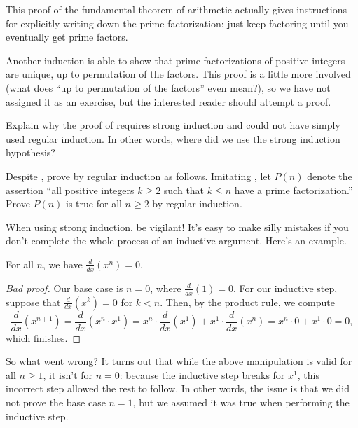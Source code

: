 \documentclass[../notes.tex]{subfiles}
\begin{document}
\begin{remark}
    This proof of the fundamental theorem of arithmetic actually gives instructions for explicitly writing down the prime factorization: just keep factoring until you eventually get prime factors. %
\end{remark}
\begin{remark}
    Another induction is able to show that prime factorizations of positive integers are unique, up to permutation of the factors. This proof is a little more involved (what does ``up to permutation of the factors'' even mean?), so we have not assigned it as an exercise, but the interested reader should attempt a proof.
\end{remark}
\begin{exercise} \label{exe:fta-uses-strong-induction}
    Explain why the proof of  requires strong induction and could not have simply used regular induction. In other words, where did we use the strong induction hypothesis?
\end{exercise}
\begin{exe} \label{exe:fta-regular-induction}
    Despite , prove  by regular induction as follows. Imitating , let $P(n)$ denote the assertion ``all positive integers $k\ge2$ such that $k\le n$ have a prime factorization.'' Prove $P(n)$ is true for all $n\ge2$ by regular induction.
\end{exe}
When using strong induction, be vigilant! It's easy to make silly mistakes if you don't complete the whole process of an inductive argument. Here's an example.
\begin{badtheorem}
    For all $n$, we have $\frac{d}{dx}(x^n)=0$.
\end{badtheorem}
\begin{proof}[Bad proof]
    Our base case is $n=0$, where $\frac{d}{dx}(1)=0$. For our inductive step, suppose that $\frac{d}{dx}(x^k)=0$ for $k<n$. Then, by the product rule, we compute
    \[ \frac d{dx}\left(x^{n+1}\right)= \frac d{dx}\left(x^n \cdot x^1\right)=x^n\cdot\frac d{dx}\left(x^1\right)+ x^1\cdot\frac d{dx}\left(x^n\right) =x^n\cdot0+x^1\cdot0=0,\]
    which finishes.
\end{proof}
So what went wrong? It turns out that while the above manipulation is valid for all $n\ge 1$, it isn't for $n=0$: because the inductive step breaks for $x^1$, this incorrect step allowed the rest to follow. In other words, the issue is that we did not prove the base case $n = 1$, but we assumed it was true when performing the inductive step.
\end{document}
